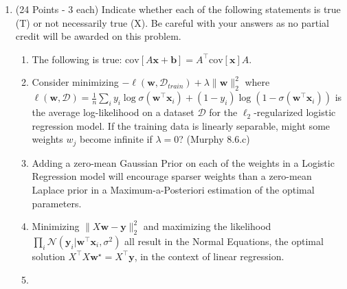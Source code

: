 \documentclass[letter, 12pt]{article}
\begin{document}
\begin{enumerate}
\item (24 Points - 3 each) Indicate whether each of the following
    statements is true (T) or not necessarily true (X).  Be careful with
    your answers as no partial credit will be awarded on this problem.
    \begin{enumerate}
    \item
      \raisebox{.1in}{\fbox{\parbox[t][.4in]{.4in}{\mbox{\hspace{.4in}}}}} \parbox[t]{5in}{
      The following is true: $\mathrm{cov}[A\mathbf{x} + \mathbf{b}] = A^\top\mathrm{cov}[\mathbf{x}]A$.
    }
    \vspace{.4in}
    \item
      \raisebox{.1in}{\fbox{\parbox[t][.4in]{.4in}{\mbox{\hspace{.4in}}}}} \parbox[t]{5in}{
      Consider minimizing $-\ell(\mathbf{w},\mathcal{D}_{train}) +
      \lambda\|\mathbf{w}\|_2^2$ where $\ell(\mathbf{w},\mathcal{D}) =
      \frac{1}{n}\sum_i y_i\log\sigma(\mathbf{w}^\top \mathbf{x}_i) + (1-y_i)\log(1 -
      \sigma(\mathbf{w}^\top\mathbf{x}_i))$ is the average
      log-likelihood on a dataset $\mathcal{D}$ for the $\ell_2$-regularized logistic
      regression model. If the training data is linearly separable, might some weights
      $w_j$ become infinite if $\lambda=0$? (Murphy 8.6.c)
    }
    \vspace{.4in}
    \item
      \raisebox{.1in}{\fbox{\parbox[t][.4in]{.4in}{\mbox{\hspace{.4in}}}}} \parbox[t]{5in}{
      Adding a zero-mean Gaussian Prior on each of the weights in a Logistic Regression
      model will encourage sparser weights than a zero-mean Laplace prior in a Maximum-a-Posteriori
      estimation of the optimal parameters.
      }
    \vspace{.4in}
    \item
      \raisebox{.1in}{\fbox{\parbox[t][.4in]{.4in}{\mbox{\hspace{.4in}}}}} \parbox[t]{5in}{
      Minimizing $\|X\mathbf{w} - \mathbf{y}\|_2^2$ and maximizing the likelihood
      $\prod_i \mathcal{N}(\mathbf{y}_i | \mathbf{w}^\top\mathbf{x}_i, \sigma^2)$ all
      result in the Normal Equations, the optimal solution $X^\top X\mathbf{w}^\star = X^\top \mathbf{y}$,
      in the context of linear regression.
      }
    \vspace{.4in}
    \item
      \raisebox{.1in}{\fbox{\parbox[t][.4in]{.4in}{\mbox{\hspace{.4in}}}}} \parbox[t]{5in}{
}
\end{enumerate}
\end{enumerate}
\end{document}
